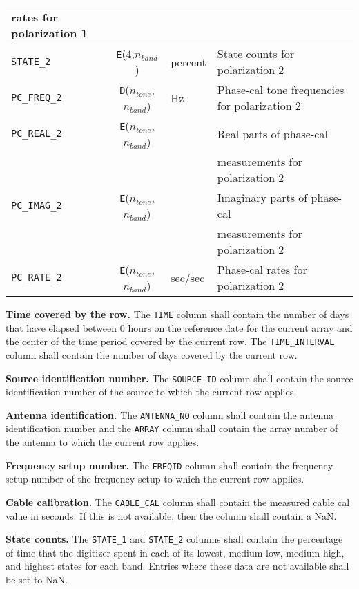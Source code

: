 \documentclass[twoside]{article}
\newcommand{\Hi}[1]{\textcolor{hicol}{#1}}
\newcommand{\nband}{$n_{band}$}
\newcommand{\ntone}{$n_{tone}$}
\begin{document}
\begin{center}
\begin{tabular}{lcll}
                                        rates for polarization 1 \\
\hline
{\tt STATE\_2}    & \Hi{{\tt E}}(4,\nband) & percent & State counts for
                                         polarization 2 \\
{\tt PC\_FREQ\_2} & {\tt D}(\ntone,\nband) & Hz & Phase-cal tone
                                        frequencies for polarization 2 \\
{\tt PC\_REAL\_2} & {\tt E}(\ntone,\nband) &    & Real parts of phase-cal \\
                  & & &\hspace{1em} measurements for polarization 2 \\
{\tt PC\_IMAG\_2} & {\tt E}(\ntone,\nband) &    & Imaginary parts of phase-cal \\
                  & & &\hspace{1em} measurements for polarization 2 \\
{\tt PC\_RATE\_2} & {\tt E}(\ntone,\nband) & sec/sec & Phase-cal
                                        rates for polarization 2 \\
\end{tabular}
\end{center}

{\bf Time covered by the row.}  The {\tt TIME} column shall contain
the number of days that have elapsed between 0 hours on the reference
date for the current array and the center of the time period covered
by the current row.  The {\tt TIME\_INTERVAL} column shall contain the
number of days covered by the current row.

{\bf Source identification number.}  The {\tt SOURCE\_ID} column shall
contain the source identification number of the source to which the
current row applies.

{\bf Antenna identification.}  The {\tt ANTENNA\_NO} column shall
contain the antenna identification number and the {\tt ARRAY} column
shall contain the array number of the antenna to which the current
\Hi{row} applies.

{\bf Frequency setup number.}  The {\tt FREQID} column shall contain
the frequency setup number of the frequency setup to which the current
\Hi{row} applies.

{\bf Cable calibration.} The {\tt CABLE\_CAL} column shall contain the
measured cable cal value in seconds.  If this is not available, then
the column shall contain a NaN.

{\bf State counts.} The {\tt STATE\_1} and {\tt STATE\_2} columns
shall contain the percentage of time that the digitizer spent in each
of its lowest, medium-low, medium-high, and highest states for each
band.  Entries where these data are not available shall be set to NaN.
\end{document}
